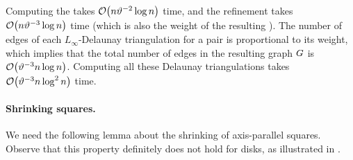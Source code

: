 \documentclass[12pt]{article}%
\begin{document}
Computing the \SSPD takes $\Of\pth{n \epsA^{-2} \log n}$ time, and the
refinement takes $\Of\pth{n \epsA^{-3} \log n}$ time (which is also
the weight of the resulting \SSPD). The number of edges of each
$L_\infty$-Delaunay triangulation for a pair is proportional to its
weight, which implies that the total number of edges in the resulting
graph $G$ is $\Of\pth{ \epsA^{-3} n\log n}$. Computing all these
Delaunay triangulations takes $\Of\pth{ \epsA^{-3}n \log^2 n}$ time.


\paragraph{Shrinking squares.}
We need the following lemma about the shrinking of axis-parallel
squares.  Observe that this property definitely does not hold for
disks, as illustrated in .
\end{document}
